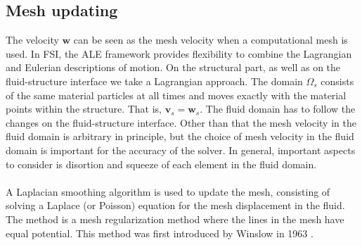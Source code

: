 \subsection{Mesh updating}
The velocity $\mathbf{w}$ can be seen as the mesh velocity when a computational mesh is used. In FSI, the ALE framework provides flexibility to combine the Lagrangian and Eulerian descriptions of motion. On the structural part, as well as on the fluid-structure interface we take a Lagrangian approach. The domain $\Omega_s$ consists of the same material particles at all times and moves exactly with the material points within the structure. That is, $\mathbf{v}_s = \mathbf{w}_s$. The fluid domain has to follow the changes on the fluid-structure interface. Other than that the mesh velocity in the fluid domain is arbitrary in principle, but the choice of mesh velocity in the fluid domain is important for the accuracy of the solver. In general, important aspects to consider is disortion and squeeze of each element in the fluid domain. \\
\\
A Laplacian smoothing algorithm is used to update the mesh, consisting of solving a Laplace (or Poisson) equation for the mesh displacement in the fluid. The method is a mesh regularization method where the lines in the mesh have equal potential. This method was first introduced by Winslow in 1963 \cite{Wins63}.
